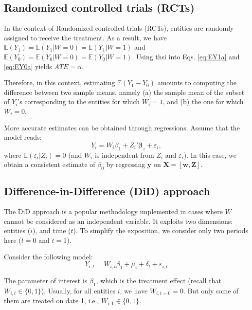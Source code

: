 \documentclass[
  12pt,
]{book}
\theoremstyle{definition}
\theoremstyle{definition}
\theoremstyle{definition}
\theoremstyle{definition}
\theoremstyle{remark}
\begin{document}
\hypertarget{randomized-controlled-trials-rcts}{%
\subsection{Randomized controlled trials (RCTs)}\label{randomized-controlled-trials-rcts}}

In the context of Randomized controlled trials (RCTs), entities are randomly assigned to receive the treatment. As a result, we have \(\mathbb{E}(Y_1) = \mathbb{E}(Y_1|W=0) = \mathbb{E}(Y_1|W=1)\) and \(\mathbb{E}(Y_0) = \mathbb{E}(Y_0|W=0) = \mathbb{E}(Y_0|W=1)\). Using thsi into Eqs. \eqref{eq:EY1a} and \eqref{eq:EY0a} yields \(ATE = \alpha\).

Therefore, in this context, estimating \(\mathbb{E}(Y_1-Y_0)\) amounts to computing the difference between two sample means, namely (a) the sample mean of the subset of \(Y_i\)'s corresponding to the entities for which \(W_i=1\), and (b) the one for which \(W_i=0\).

More accurate estimates can be obtained through regressions. Assume that the model reads:
\[
Y_{i} = W_{i} \beta_{1} + Z_i'\boldsymbol\beta_z + \varepsilon_i,
\]
where \(\mathbb{E}(\varepsilon_i|Z_i) = 0\) (and \(W_i\) is independent from \(Z_i\) and \(\varepsilon_i\)). In this case, we obtain a consistent estimate of \(\beta_0\) by regressing \(\mathbf{y}\) on \(\mathbf{X} = [\mathbf{w},\mathbf{Z}]\).

\hypertarget{difference-in-difference-did-approach}{%
\subsection{Difference-in-Difference (DiD) approach}\label{difference-in-difference-did-approach}}

The DiD approach is a popular methodology implemented in cases where \(W\) cannot be considered as an independent variable. It exploits two dimensions: entities (\(i\)), and time (\(t\)). To simplify the exposition, we consider only two periods here (\(t=0\) and \(t=1\)).

Consider the following model:
\begin{equation}
Y_{i,t} = W_{i,t} \beta_1 + \mu_i + \delta_t + \varepsilon_{i,t}\label{eq:DiD}
\end{equation}

The parameter of interest is \(\beta_{1}\), which is the treatment effect (recall that \(W_{i,t} \in \{0,1\}\)). Usually, for all entities \(i\), we have \(W_{i,t=0}=0\). But only some of them are treated on date 1, i.e., \(W_{i,1} \in \{0,1\}\).
\end{document}

